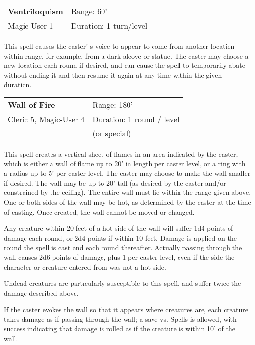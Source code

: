 \documentclass[a4paper,twoside,openany,10pt]{book}
\begin{document}
\begin{multicols}{2}
\smallskip\begin{flushleft} 
	\begin{tabularx}{0.45\textwidth}{@{}m{3.5cm}m{5.5cm}@{}} 
		\textbf{Ventriloquism} & Range: 60'\\
Magic-User 1 &Duration: 1 turn/level\\
	\end{tabularx}\end{flushleft}

This spell causes the caster' s voice to appear to come from another location within range, for example, from a dark alcove or statue. The caster may choose a new location each round if desired, and can cause the spell to temporarily abate without ending it and then resume it again at any time within the given duration.

\smallskip\begin{flushleft} 
\begin{tabularx}{0.45\textwidth}{@{}m{3.4cm}m{5.5cm}@{}} 
\textbf{Wall of Fire} & Range: 180'\\
Cleric 5, Magic-User 4 & Duration: 1 round / level\\
& (or special)\\
\end{tabularx}\smallskip\end{flushleft}


This spell creates a vertical sheet of flames in an area indicated by the caster, which is either a wall of flame up to 20' in length per caster level, or a ring with a radius up to 5' per caster level. The caster may choose to make the wall smaller if desired. The wall may be up to 20' tall (as desired by the caster and/or constrained by the ceiling). The entire wall must lie within the range given above. One or both sides of the wall may be hot, as determined by the caster at the time of casting. Once created, the wall cannot be moved or changed.

Any creature within 20 feet of a hot side of the wall will suffer 1d4 points of damage each round, or 2d4 points if within 10 feet. Damage is applied on the round the spell is cast and each round thereafter. Actually passing through the wall causes 2d6 points of damage, plus 1 per caster level, even if the side the character or creature entered from was not a hot side.

Undead creatures are particularly susceptible to this spell, and suffer twice the damage described above.

If the caster evokes the wall so that it appears where creatures are, each creature takes damage as if passing through the wall; a save vs. Spells is allowed, with success indicating that damage is rolled as if the creature is within 10' of the wall.


\end{multicols}
\end{document}
